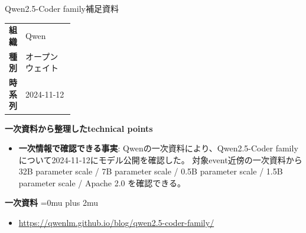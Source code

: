 \begin{technicalnote}{Qwen2.5-Coder family}{補足資料}
\begingroup
\begin{tabularx}{\linewidth}{@{}>{\bfseries}p{0.22\linewidth}X@{}}
組織 & Qwen \\
種別 & オープンウェイト \\
時系列 & 2024-11-12 \\
\end{tabularx}
\smallskip
{\bfseries 一次資料から整理したtechnical points}
\begin{itemize}[leftmargin=1.5em,itemsep=0.35em]
\item \textbf{一次情報で確認できる事実}: Qwenの一次資料により、Qwen2.5-Coder familyについて2024-11-12にモデル公開を確認した。 対象event近傍の一次資料から 32B parameter scale / 7B parameter scale / 0.5B parameter scale / 1.5B parameter scale / Apache 2.0 を確認できる。
\end{itemize}
\begin{minipage}{\linewidth}
\begin{samepage}
{\bfseries 一次資料}
\begingroup\sloppy
\Urlmuskip=0mu plus 2mu\relax
\begin{itemize}[leftmargin=1.5em,itemsep=0.25em]
\item {\scriptsize\url{https://qwenlm.github.io/blog/qwen2.5-coder-family/}}
\end{itemize}
\endgroup
\end{samepage}
\end{minipage}
\endgroup
\end{technicalnote}
\medskip

